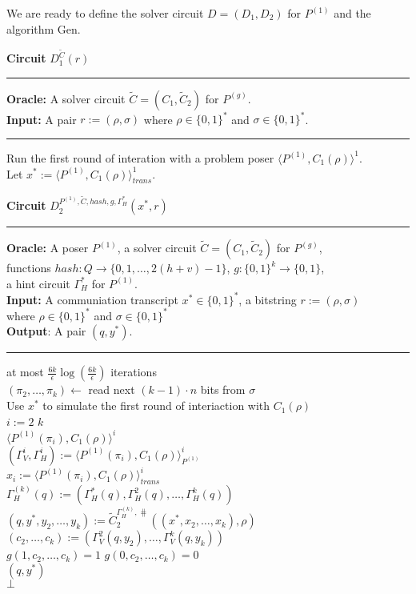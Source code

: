%
We are ready to define the solver circuit $D = (D_1, D_2)$ for $P^{(1)}$ and the algorithm Gen.
%
\begin{codeblock}
  \textbf{Circuit} $D_1^{\widetilde{C}}(r)$
  \medskip \hrule \medskip
  \textbf{Oracle:} A solver circuit $\widetilde{C} = (C_1, \widetilde{C}_2)$ for $P^{(g)}$.\\
  \textbf{Input:} A pair $r := (\rho, \sigma)$ where $ \rho \in \{0,1\}^{*}$ and $\sigma \in \{0,1\}^{*}$.
  \medskip\hrule\medskip
  Run the first round of interation with a problem poser $\langle P^{(1)}, C_1(\rho) \rangle^1$. \\
  Let $x^* := \langle P^{(1)}, C_1(\rho) \rangle^1_{\mathit{trans}}$.
\end{codeblock}
%
\begin{codeblock}
  \textbf{Circuit} $D_2^{P^{(1)}, \widetilde{C}, \mathit{hash}, g,  \Gamma_H^*}(x^*, r)$
  \medskip \hrule \medskip
  \textbf{Oracle:} A poser $P^{(1)}$, a solver circuit $\widetilde{C} = (C_1, \widetilde{C}_2)$ for $P^{(g)}$, \\
  \IndII functions $hash : Q \rightarrow \{0,1, \dots, 2(h+v)-1\}$, $g:\{0,1\}^k \rightarrow \{0,1\}$, \\
  \IndII a hint circuit $\Gamma_H^*$ for $P^{(1)}$. \\
  \textbf{Input:} A communiation transcript $x^* \in \{0,1\}^{*}$, a bitstring $r := (\rho, \sigma)$ \\
  \IndII where $\rho \in \{0,1\}^{*}$ and $\sigma \in \{0,1\}^{*}$\\
  \textbf{Output}: A pair $(q, y^*)$.
  \medskip \hrule \medskip
  \For at most $\frac{6k}{\epsilon} \log(\frac{6k}{\epsilon})$ iterations \Do \\
  \IndI $(\pi_2, \dots, \pi_k) \leftarrow$ read next $(k-1)\cdot n$ bits from $\sigma$ \\
  \IndI Use $x^*$ to simulate the first round of interiaction with $C_1(\rho)$ \\
  \IndI \For $i:=2$ \To $k$ \Do \\
  \IndII \Run $\langle P^{(1)}(\pi_i), C_1(\rho)\rangle^i$ \\
  \IndIII $(\Gamma_V^{i}, \Gamma_H^{i}) := \langle P^{(1)}(\pi_i), C_1(\rho) \rangle^i_{P^{(1)}}$ \\
  \IndIII $x_i := \langle P^{(1)}(\pi_i), C_1(\rho) \rangle^i_{\mathit{trans}}$ \\
  \IndI $\Gamma_H^{(k)}(q) := (\Gamma_H^{*}(q), \Gamma_H^{2}(q), \dots, \Gamma_H^{k}(q))$ \\
  \IndI $(q, y^*, y_2, \dots, y_k) := \widetilde{C}_2^{\Gamma_H^{(k)}, \hash}((x^*, x_2, \dots, x_k), \rho)$\\
  \IndI $(c_2, \dots, c_k) := (\Gamma_V^2(q, y_2), \dotsc, \Gamma_V^{k}(q, y_k))$ \\
  \IndI \If $g(1, c_{2}, \dots, c_k) = 1$ \And $g(0,c_{2}, \dots, c_k) = 0$ \Then \\
  \IndII \Return $(q, y^*)$ \\
  \Return $\bot$
%
\end{codeblock}
